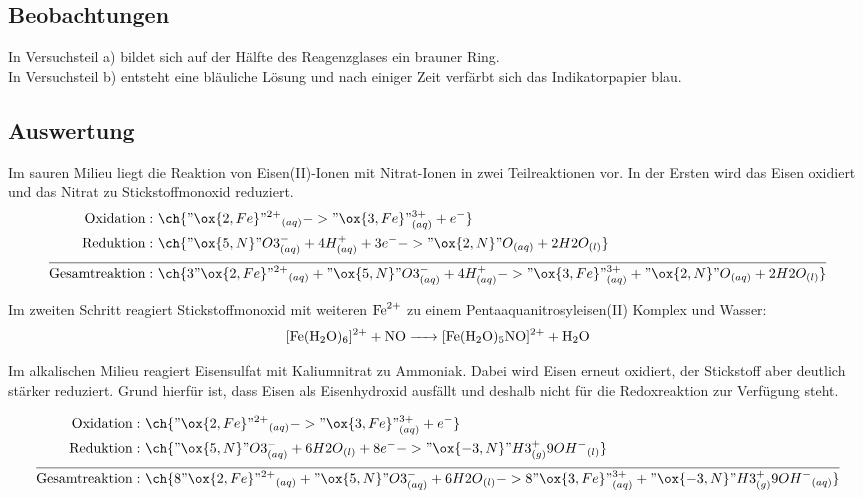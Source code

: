 \documentclass[12pt]{scrartcl} %
\begin{document}
\subsection{Beobachtungen}
In Versuchsteil a) bildet sich auf der Hälfte des Reagenzglases ein brauner Ring.\\ 
In Versuchsteil b) entsteht eine bläuliche Lösung und nach einiger Zeit verfärbt sich das Indikatorpapier blau.



\subsection{Auswertung}

Im sauren Milieu liegt die Reaktion von Eisen(II)-Ionen mit Nitrat-Ionen in zwei Teilreaktionen vor. In der Ersten wird das Eisen oxidiert und das Nitrat zu Stickstoffmonoxid reduziert.
\begin{align*}
\mathrm{Oxidation:} &~ \ch{"\ox{2,Fe}" {^{2+}}_{(aq)} ->  "\ox{3,Fe}" {}^{3+}_{(aq)} + e^{-}} \\
\notag
\mathrm{Reduktion:} &~ \ch{"\ox{5,N}" {}O3^{-}_{(aq)} + 4 H^+_{(aq)} + 3 e^{-} -> "\ox{2,N}" O{}_{(aq)} + 2 H2O_{(l)}}\\[2mm]
\hline\notag
\\[-5mm]
\mathrm{Gesamtreaktion:} &~ \ch{3 "\ox{2,Fe}" {^{2+}}_{(aq)} + "\ox{5,N}" {}O3^{-}_{(aq)} + 4 H^+_{(aq)} -> "\ox{3,Fe}" {}^{3+}_{(aq)} + "\ox{2,N}" O{}_{(aq)} + 2 H2O_{(l)}}
\end{align*}

Im zweiten Schritt reagiert Stickstoffmonoxid mit weiteren $\ce{Fe^{2+}}$ zu einem Pentaaquanitrosyleisen(II) Komplex und Wasser:
\begin{equation}
    \ce{[Fe(H2O)6]^{2+} + NO -> [Fe(H2O)_5NO]^{2+} + H2O}
\end{equation}

Im alkalischen Milieu reagiert Eisensulfat mit Kaliumnitrat zu Ammoniak. Dabei wird Eisen erneut oxidiert, der Stickstoff aber deutlich stärker reduziert. Grund hierfür ist, dass Eisen als Eisenhydroxid ausfällt und deshalb nicht für die Redoxreaktion zur Verfügung steht.

\begin{align*}
\mathrm{Oxidation:} &~ \ch{"\ox{2,Fe}" {^{2+}}_{(aq)} ->  "\ox{3,Fe}" {}^{3+}_{(aq)} + e^{-}} \\
\notag
\mathrm{Reduktion:} &~ \ch{"\ox{5,N}" {}O3^{-}_{(aq)} + 6 {H2O}_{(l)} + 8 e^{-} -> "\ox{-3,N}" {H3}_{(g)} ^ +  9 {OH^{-}}_{(l)}}\\[2mm]
\hline\notag
\\[-5mm]
\mathrm{Gesamtreaktion:} &~ \ch{8 "\ox{2,Fe}" {^{2+}}_{(aq)} + "\ox{5,N}" {}O3^{-}_{(aq)} + 6 {H2O}_{(l)} -> 8 "\ox{3,Fe}" {}^{3+}_{(aq)} + "\ox{-3,N}" {H3}_{(g)} ^ + 9 {OH^{-}}_{(aq)}}
\end{align*}
\end{document}
